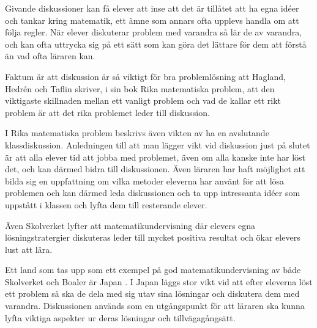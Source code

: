 \textcolor{turkos} {
Givande diskussioner kan få elever att inse att det är tillåtet att ha egna idéer och tankar kring matematik, ett ämne som annars ofta upplevs handla om att följa regler. När elever diskuterar problem med varandra så lär de av varandra, och kan ofta uttrycka sig på ett sätt som kan göra det lättare för dem att förstå än vad ofta läraren kan.  \cite{TheElephant}
}

\textcolor{turkos} {
Faktum är att diskussion är så viktigt för bra problemlösning att Hagland, Hedrén och Taflin skriver, i sin bok Rika matematiska problem, att den viktigaste skillnaden mellan ett vanligt problem och vad de kallar ett rikt problem är att det rika problemet leder till diskussion. \cite{RikaProblem}
}

\textcolor{turkos}{
I Rika matematiska problem beskrivs även vikten av ha en avslutande klassdiskussion. Anledningen till att man lägger vikt vid diskussion just på slutet är att alla elever tid att jobba med problemet, även om alla kanske inte har löst det, och kan därmed bidra till diskussionen. Även läraren har haft möjlighet att bilda sig en uppfattning om vilka metoder eleverna har använt för att lösa problemen och kan därmed leda diskussionen och ta upp intressanta idéer som uppstått i klassen och lyfta dem till resterande elever. \cite{RikaProblem}
}

\textcolor{turkos} {
Även Skolverket lyfter att matematikundervisning där elevers egna lösningstratergier diskuteras leder till mycket positiva resultat och ökar elevers lust att lära. \cite{Skolverket03}
}

\textcolor{turkos} {
Ett land som tas upp som ett exempel på god matematikundervisning av både Skolverket och Boaler är Japan \cite{TheElephant}. I Japan läggs stor vikt vid att efter eleverna löst ett problem så ska de dela med sig utav sina lösningar och diskutera dem med varandra. Diskussionen används som en utgångspunkt för att läraren ska kunna lyfta viktiga aspekter ur deras lösningar och tillvägagångsätt. \cite{Skolverket03}
}







